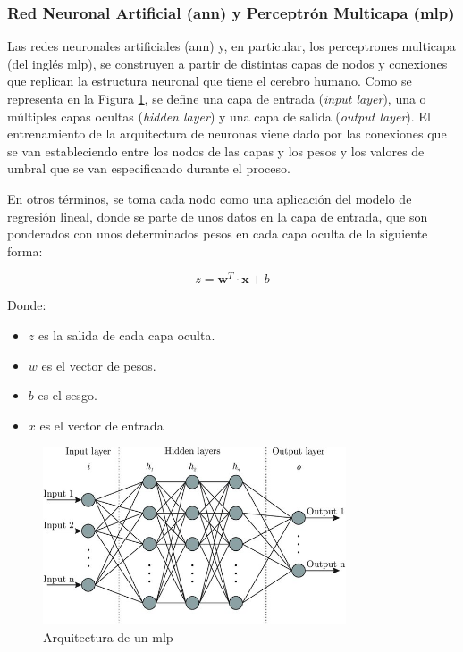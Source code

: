 \subsubsection{Red Neuronal Artificial (\acrshort{ann}) y Perceptrón Multicapa (\acrshort{mlp})}
\label{sec:dlann}

Las redes neuronales artificiales (\gls{ann}) y, en particular, los perceptrones multicapa (del inglés \gls{mlp}), se construyen a partir de distintas capas de nodos y conexiones que replican la estructura neuronal que tiene el cerebro humano. Como se representa en la Figura \ref{fig:ann}, se define una capa de entrada (\textit{input layer}), una o múltiples capas ocultas (\textit{hidden layer}) y una capa de salida (\textit{output layer}). El entrenamiento de la arquitectura de neuronas viene dado por las conexiones que se van estableciendo entre los nodos de las capas y los pesos y los valores de umbral que se van especificando durante el proceso. \cite{ibmann}

\vspace{3mm}

En otros términos, se toma cada nodo como una aplicación del modelo de regresión lineal, donde se parte de unos datos en la capa de entrada, que son ponderados con unos determinados pesos en cada capa oculta de la siguiente forma:

\[z = \mathbf{w}^T \cdot \mathbf{x} + b\]

Donde:
\begin{itemize}
    \renewcommand{\labelitemi}{}
    \item \(z\) es la salida de cada capa oculta. 
    \item \(w\) es el vector de pesos. 
    \item \(b\) es el sesgo.
    \item \(x\) es el vector de entrada
\end{itemize}

\vspace{3mm}

\begin{figure}[h!]
    \centering
    \includegraphics[width=0.8\textwidth]{img/teoria/ann.jpg}
    \caption{Arquitectura de un \acrshort{mlp} \cite{ann}}
    \label{fig:ann}
\end{figure}

